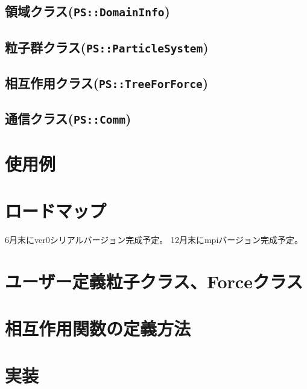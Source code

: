 \documentclass[12pt,a4paper]{jarticle}
\begin{document}
\subsection{領域クラス({\tt PS::DomainInfo})}


\subsection{粒子群クラス({\tt PS::ParticleSystem})}


\subsection{相互作用クラス({\tt PS::TreeForForce})}


\subsection{通信クラス({\tt PS::Comm})}
\label{sec:parameter}


\section{使用例}
\label{sec:sample}


\section{ロードマップ}
\label{sec:roadmap}

6月末にver0シリアルバージョン完成予定。
12月末にmpiバージョン完成予定。

\appendix

\section{ユーザー定義粒子クラス、Forceクラス}
\label{sec:particle_subclass}


\section{相互作用関数の定義方法}


\section{実装}
\label{sec:implementation}

\end{document}
